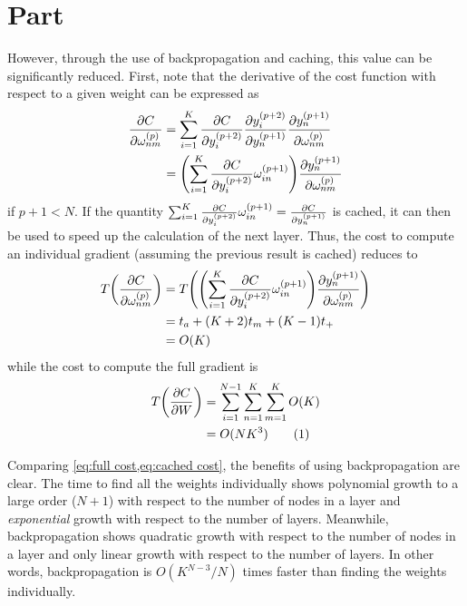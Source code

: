 \documentclass{article}
\newcommand{\enterproblemHeader}[1]{
}
\newcommand{\exitproblemHeader}[1]{
}
\newcounter{problem} %
\newcommand{\problemName}{}
\newenvironment{problem}[1][Part \theproblem]{ %
	\stepcounter{problem} %
	\renewcommand{\problemName}{#1} %
	\section{\problemName} %
	\enterproblemHeader{\problemName} %
}{
	\exitproblemHeader{\problemName} %
}
\newcommand{\numberthis}{\addtocounter{equation}{1}\tag{\theequation}}
\begin{document}
\begin{problem}
	
	However, through the use of backpropagation and caching, this value can be significantly reduced. First, note that the derivative of the cost function with respect to a given weight can be expressed as
	\begin{align*}
		\pdv{C}{\omega_{nm}^{(p)}} &= \sum_{i=1}^{K}\pdv{C}{y_i^{(p+2)}}\pdv{y_i^{(p+2)}}{y_n^{(p+1)}}\pdv{y_n^{(p+1)}}{\omega_{nm}^{(p)}} \\
		&= \qty(\sum_{i=1}^{K} \pdv{C}{y_i^{(p+2)}} \omega_{in}^{(p+1)}) \pdv{y_n^{(p+1)}}{\omega_{nm}^{(p)}}
	\end{align*}
	if \(p + 1 < N\). If the quantity \(\sum_{i=1}^{K} \pdv{C}{y_i^{(p+2)}} \omega_{in}^{(p+1)} = \pdv{C}{y_n^{(p+1)}}\) is cached, it can then be used to speed up the calculation of the next layer. Thus, the cost to compute an individual gradient (assuming the previous result is cached) reduces to
	\begin{align*}
		T\qty(\pdv{C}{\omega_{nm}^{(p)}}) &= T\qty(\qty(\sum_{i=1}^{K} \pdv{C}{y_i^{(p+2)}} \omega_{in}^{(p+1)}) \pdv{y_n^{(p+1)}}{\omega_{nm}^{(p)}}) \\
		&= t_a + (K+2)t_m + (K-1)t_+ \\
		&= O(K)
	\end{align*}
	while the cost to compute the full gradient is
	\begin{align*}
		T\qty(\pdv{C}{W}) &= \sum_{i=1}^{N-1}\sum_{n=1}^K\sum_{m=1}^K O\qty(K) \\
		&= O(NK^3) \numberthis \label{eq:cached cost}
	\end{align*}
	
	Comparing \cref{eq:full cost,eq:cached cost}, the benefits of using backpropagation are clear. The time to find all the weights individually shows polynomial growth to a large order (\(N + 1\)) with respect to the number of nodes in a layer and \textit{exponential} growth with respect to the number of layers. Meanwhile, backpropagation shows quadratic growth with respect to the number of nodes in a layer and only linear growth with respect to the number of layers. In other words, backpropagation is \(O(K^{N-3}/N)\) times faster than finding the weights individually.
\end{problem}
\clearpage

\end{document}
